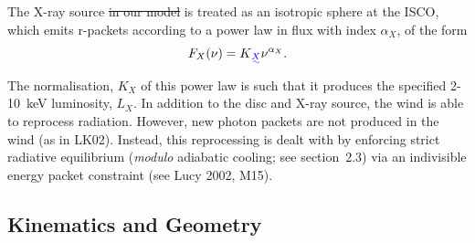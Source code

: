 \documentclass[useAMS,usenatbib]{mn2e_x}
\providecommand{\DIFadd}[1]{{\protect\color{blue}\uwave{#1}}} %
\providecommand{\DIFdel}[1]{{\protect\color{red}\sout{#1}}}                      %
\providecommand{\DIFaddbegin}{} %
\providecommand{\DIFaddend}{} %
\providecommand{\DIFdelbegin}{} %
\providecommand{\DIFdelend}{} %
\begin{document}
The X-ray source \DIFdelbegin \DIFdel{in our model }\DIFdelend is treated as an isotropic sphere at the ISCO,
which emits r-packets according to a power law in flux with index $\alpha_X$, of the form
\begin{equation}
F_X (\nu) = K\DIFaddbegin \DIFadd{_X }\DIFaddend \nu^{\alpha_X}.
\end{equation}
The normalisation, $K_X$ of this power law is such that it 
produces the specified 2-10~keV luminosity, $L_X$.
In addition to the disc and X-ray source, 
the wind is able to reprocess radiation. However, new 
photon packets are not produced in the wind (as in LK02). 
Instead, this reprocessing is dealt with by enforcing strict
radiative equilibrium ({\em modulo} adiabatic cooling; see section~2.3)
via an indivisible energy packet
constraint (see Lucy 2002, M15).

\DIFdelbegin %




\DIFdelend \subsection{Kinematics and Geometry}
\end{document}
